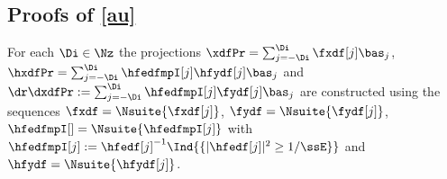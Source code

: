 %                                                                 
% 
%
\subsection{Proofs of \cref{au}}\label{a:au}
\begin{te}
For each
  $\Di\in\Nz$ the projections $\xdfPr=\sum_{j=-\Di}^{\Di}\fxdf[j]\bas_j$,
  $\hxdfPr=\sum_{j=-\Di}^{\Di}\hfedfmpI[j]\hfydf[j]\bas_j$ and
  $\dr\dxdfPr:=\sum_{j=-\Di}^{\Di}\hfedfmpI[j]\fydf[j]\bas_j$
  are constructed using
the sequences  $\fxdf=\Nsuite{\fxdf[j]}$, $\fydf=\Nsuite{\fydf[j]}$,
$\hfedfmpI[]=\Nsuite{\hfedfmpI[j]}$ with $\hfedfmpI[j]:=\hfedf[j]^{-1}\Ind{\{|\hfedf[j]|^2\geq1/\ssE\}}$  and  $\hfydf=\Nsuite{\hfydf[j]}$. 
\end{te}
